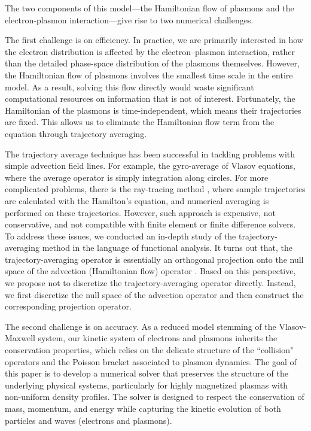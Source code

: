 \documentclass{article}
\numberwithin{equation}{section}
\begin{document}
The two components of this model—the Hamiltonian flow of plasmons and the electron-plasmon interaction—give rise to two numerical challenges. 

The first challenge is on efficiency. In practice, we are primarily interested in how the electron distribution is affected by the electron–plasmon interaction, rather than the detailed phase-space distribution of the plasmons themselves. However, the Hamiltonian flow of plasmons involves the smallest time scale in the entire model. As a result, solving this flow directly would waste significant computational resources on information that is not of interest. Fortunately, the Hamiltonian of the plasmons is time-independent, which means their trajectories are fixed. This allows us to eliminate the Hamiltonian flow term from the equation through trajectory averaging.

The trajectory average technique \cite{bostan2010transport} has been successful in tackling problems with simple advection field lines. For example, the gyro-average of Vlasov equations, where the average operator is simply integration along circles. For more complicated problems, there is the ray-tracing method \cite{aleynikov2015stability}, where sample trajectories are calculated with the Hamilton’s equation, and numerical averaging is performed on these trajectories. However, such approach is expensive, not conservative, and not compatible with finite element or finite difference solvers. To address these issues, we conducted an in-depth study of the trajectory-averaging method in the language of functional analysis. It turns out that, the trajectory-averaging operator is essentially an orthogonal projection onto the null space of the advection (Hamiltonian flow) operator \cite{bostan2010transport}. Based on this perspective, we propose not to discretize the trajectory-averaging operator directly. Instead, we first discretize the null space of the advection operator and then construct the corresponding projection operator.

The second challenge is on accuracy. As a reduced model stemming of the Vlasov-Maxwell system, our kinetic system of electrons and plasmons inherits the conservation properties, which relies on the delicate structure of the ``collision" operators and the Poisson bracket associated to plasmon dynamics. The goal of this paper is to develop a numerical solver that preserves the structure of the underlying physical systems, particularly for highly magnetized plasmas with non-uniform density profiles. The solver is designed to respect the conservation of mass, momentum, and energy while capturing the kinetic evolution of both particles and waves (electrons and plasmons).
\end{document}
